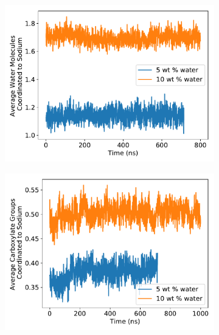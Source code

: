 \documentclass{article}
\begin{document}
  \begin{figure}[!htb]
  \centering
  \begin{subfigure}{0.45\textwidth}
  \includegraphics[width=\textwidth]{Na_water_coordination.pdf}
  \caption{}\label{fig:na_water_coordination}
  \end{subfigure}
  \begin{subfigure}{0.45\textwidth}
  \includegraphics[width=\textwidth]{Na_hg_coordination.pdf}
  \caption{}\label{fig:na_hg_coordination}  %
  \end{subfigure}
  \end{figure}
  
\end{document}

